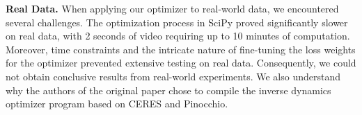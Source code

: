 \noindent\textbf{Real Data.} When applying our optimizer to real-world data, we encountered several challenges. 
The optimization process in SciPy proved significantly slower on real data, with 2 seconds of video requiring up to 10 minutes of 
computation. Moreover, time constraints and the intricate nature of fine-tuning the loss weights for the optimizer prevented extensive 
testing on real data. Consequently, we could not obtain conclusive results from real-world experiments. We also understand
why the authors of the original paper chose to compile the inverse dynamics optimizer program based on CERES and Pinocchio.